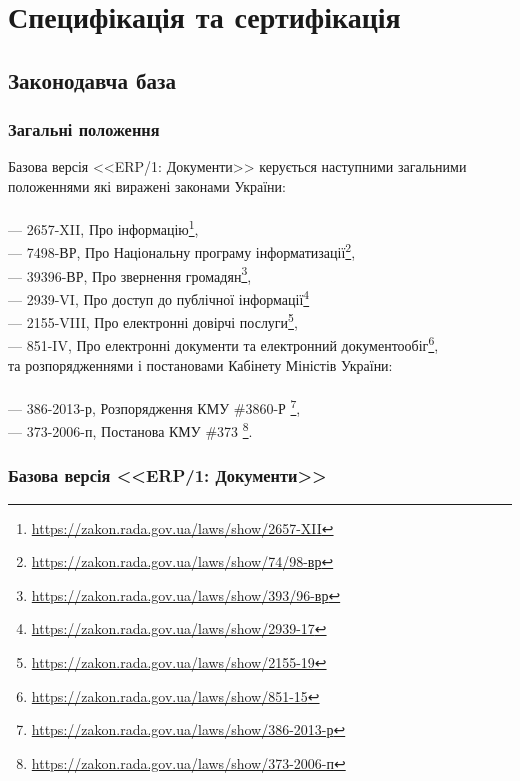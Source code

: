 \chapter{Специфікація та сертифікація}

\section{Законодавча база}

\subsection{Загальні положення}

Базова версія <<ERP/1: Документи>> керується наступними загальними положеннями які
виражені законами України:
\\
\\
--- {2657-XII}, Про інформацію\footnote{\url{https://zakon.rada.gov.ua/laws/show/2657-XII}}, \\
--- {74\/98-ВР}, Про Національну програму інформатизації\footnote{\url{https://zakon.rada.gov.ua/laws/show/74/98-вр}}, \\
--- {393\/96-ВР}, Про звернення громадян\footnote{\url{https://zakon.rada.gov.ua/laws/show/393/96-вр}}, \\
--- {2939-VI}, Про доступ до публічної інформації\footnote{\url{https://zakon.rada.gov.ua/laws/show/2939-17}} \\
--- {2155-VIII}, Про електронні довірчі послуги\footnote{\url{https://zakon.rada.gov.ua/laws/show/2155-19}}, \\
--- {851-IV}, Про електронні документи та електронний документообіг\footnote{\url{https://zakon.rada.gov.ua/laws/show/851-15}}, \\

та розпорядженнями і постановами Кабінету Міністів України:
\\
\\
--- {386-2013-р}, Розпорядження КМУ \#3860-Р \footnote{\url{https://zakon.rada.gov.ua/laws/show/386-2013-р}}, \\
--- {373-2006-п}, Постанова КМУ \#373 \footnote{\url{https://zakon.rada.gov.ua/laws/show/373-2006-п}}. \\

\newpage
\subsection{Базова версія <<ERP/1: Документи>>}

